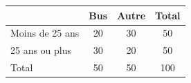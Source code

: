 \begingroup\renewcommand{\arraystretch}{1.35}
\begin{tabular}{@{}lccc@{}}\toprule
 & Bus & Autre & Total\\\midrule
Moins de 25 ans & 20 & 30 & 50\\
25 ans ou plus & 30 & 20 & 50\\
Total & 50 & 50 & 100\\
\bottomrule\end{tabular}\endgroup

\par\smallskip{}
